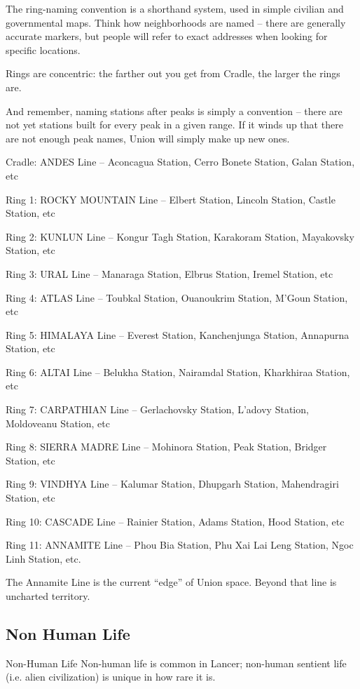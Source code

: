 The ring-naming convention is a shorthand system, used in simple civilian and governmental
maps. Think how neighborhoods are named -- there are generally accurate markers, but people
will refer to exact addresses when looking for specific locations.

Rings are concentric: the farther out you get from Cradle, the larger the rings are.

And remember, naming stations after peaks is simply a convention -- there are not yet stations
built for every peak in a given range. If it winds up that there are not enough peak names, Union
will simply make up new ones.


Cradle: ANDES  Line -- Aconcagua Station, Cerro Bonete Station, Galan Station, etc


Ring 1: ROCKY MOUNTAIN Line -- Elbert Station, Lincoln Station, Castle Station, etc


Ring 2: KUNLUN Line -- Kongur Tagh Station, Karakoram Station, Mayakovsky Station, etc


Ring 3: URAL Line -- Manaraga Station, Elbrus Station, Iremel Station, etc


Ring 4: ATLAS  Line -- Toubkal Station, Ouanoukrim Station, M’Goun Station, etc


Ring 5: HIMALAYA Line -- Everest Station, Kanchenjunga Station, Annapurna Station, etc


Ring 6: ALTAI  Line -- Belukha Station, Nairamdal Station, Kharkhiraa Station, etc





Ring 7: CARPATHIAN Line -- Gerlachovsky Station, L’adovy Station, Moldoveanu Station, etc


Ring 8: SIERRA MADRE Line -- Mohinora Station, Peak Station, Bridger Station, etc


Ring 9: VINDHYA Line -- Kalumar Station, Dhupgarh Station, Mahendragiri Station, etc


Ring 10: CASCADE Line -- Rainier Station, Adams Station, Hood Station, etc


Ring 11: ANNAMITE  Line -- Phou Bia Station, Phu Xai Lai Leng Station, Ngoc Linh Station, etc.


The Annamite Line is the current “edge” of Union space. Beyond that line is uncharted territory.

\subsection{Non Human Life}
Non-Human Life
Non-human life is common in Lancer; non-human sentient life (i.e. alien civilization) is unique in
how rare it is.


